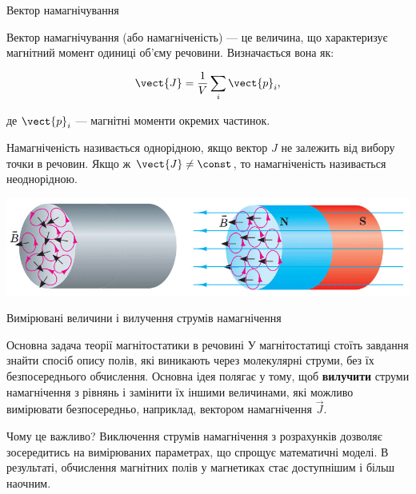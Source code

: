\documentclass[onlytextwidth]{beamer}
\begin{document}
\begin{frame}{Вектор намагнічування}{}
	\begin{block}{}
		\alert{Вектор намагнічування} (або \alert{намагніченість}) — це величина, що характеризує магнітний момент одиниці об'єму речовини. Визначається вона
		як:

		\begin{equation*}
			\vect{J} = \frac{1}{V}\sum_i\vect{p}_i,
		\end{equation*}

		де $\vect{p}_i$ --- магнітні моменти окремих частинок.
	\end{block}


	\begin{block}{}\justifying\small
		Намагніченість називається \alert{однорідною}, якщо вектор $J$ не залежить від вибору точки в речовин. Якщо ж $\vect{J}\neq\const$, то
		намагніченість
		називається \alert{неоднорідною}.
	\end{block}
	\begin{center}
		\includegraphics[width=1\linewidth]{AmpereHypotesis}
	\end{center}
\end{frame}


\begin{frame}{Вимірювані величини і вилучення струмів намагнічення}{}
	\begin{alertblock}{Основна задача теорії магнітостатики в речовині}\justifying
		У магнітостатиці стоїть завдання знайти спосіб опису полів, які виникають через молекулярні струми, без їх безпосереднього обчислення.
		Основна ідея полягає у тому, щоб \textbf{вилучити} струми намагнічення з рівнянь і замінити їх іншими величинами, які можливо вимірювати
		безпосередньо, наприклад, вектором намагнічення $\vec{J}$.
	\end{alertblock}
	\begin{block}{Чому це важливо?}\justifying
		Виключення струмів намагнічення з розрахунків дозволяє зосередитись на вимірюваних параметрах, що спрощує математичні моделі. В результаті,
		обчислення магнітних полів у магнетиках стає доступнішим і більш наочним.
	\end{block}
\end{frame}
\end{document}
